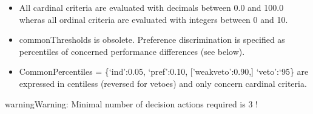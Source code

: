 \documentclass[letterpaper,10pt,english]{sphinxmanual}
\begin{document}
\begin{fulllineitems}
\begin{itemize}
\item {} 
All cardinal criteria are evaluated with decimals between 0.0 and 100.0 wheras all ordinal criteria are evaluated with integers between 0 and 10.

\item {} 
commonThresholds is obsolete. Preference discrimination is specified as percentiles of concerned performance differences (see below).

\item {} 
CommonPercentiles = \{`ind':0.05, `pref':0.10, {[}'weakveto':0.90,{]} `veto':`95\} are expressed in centiless (reversed for vetoes) and only concern cardinal criteria.

\end{itemize}

\begin{notice}{warning}{Warning:}
Minimal number of decision actions required is 3 !
\end{notice}

\end{fulllineitems}

\end{document}
